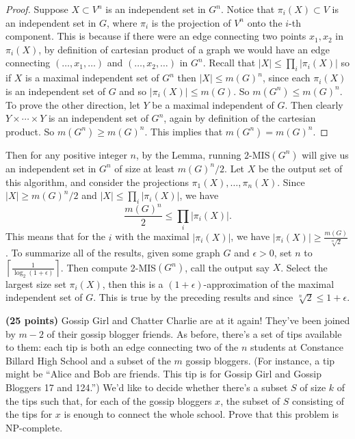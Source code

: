 \documentclass[11pt,letterpaper]{article}
\begin{document}
\begin{solution}
\begin{ilemma}
    \end{ilemma} 
    \begin{proof}
        Suppose $X\subset V^n$ is an independent set in $G^n$. Notice that $\pi_i(X)\subset V$ is an independent set in $G$, where $\pi_i$ is the projection of $V^n$ onto the $i$-th component. This is because if there were an edge connecting two points $x_1, x_2$ in $\pi_i(X)$, by definition of cartesian product of a graph we would have an edge connecting $(\ldots,x_1,\ldots)$ and $(\ldots,x_2,\ldots)$ in $G^n$. Recall that $|X|\leq \prod_i|\pi_i(X)|$ so if $X$ is a maximal independent set of $G^n$ then $|X|\leq m(G)^n$, since each $\pi_i(X)$ is an independent set of $G$ and so $|\pi_i(X)|\leq m(G)$. So $m(G^n)\leq m(G)^n$. To prove the other direction, let $Y$ be a maximal independent of $G$. Then clearly $Y\times\cdots\times Y$ is an independent set of $G^n$, again by definition of the cartesian product. So $m(G^n)\geq m(G)^n$. This implies that $m(G^n)=m(G)^n$. 
    \end{proof}
    Then for any positive integer $n$, by the Lemma, running $2$-MIS$(G^n)$ will give us an independent set in $G^n$ of size at least $m(G)^n /2$. Let $X$ be the output set of this algorithm, and consider the projections $\pi_1(X), \ldots, \pi_n(X)$. Since $|X|\geq m(G)^n /2$ and $|X|\leq \prod_i |\pi_i(X)|$, we have
    \[
        \frac{m(G)^n}{2}\leq \prod_i |\pi_i(X)|
    .\]
    This means that for the $i$ with the maximal $|\pi_i(X)|$, we have $|\pi_i(X)|\geq \frac{m(G)}{\sqrt[n]{2}}$. To summarize all of the results, given some graph $G$ and $\epsilon>0$, set $n$ to $\left\lceil \frac{1}{\log_2(1+\epsilon)} \right\rceil $. Then compute 2-MIS$(G^n)$, call the output say $X$. Select the largest size set $\pi_i(X)$, then this is a $(1+\epsilon)$-approximation of the maximal independent set of $G$. This is true by the preceding results and since $\sqrt[n]{2} \leq 1+\epsilon$. 

\end{solution}

\pagebreak
\begin{problem}\noindent
    {\bf (25 points)} Gossip Girl and Chatter Charlie are at it again! They've been joined by $m-2$ of their gossip blogger friends. As before, there's a set of tips available to them: each tip is both an edge connecting two of the $n$ students at Constance Billard High School and a subset of the $m$ gossip bloggers. (For instance, a tip might be ``Alice and Bob are friends. This tip is for Gossip Girl and Gossip Bloggers 17 and 124.'') We'd like to decide whether there's a subset $S$ of size $k$ of the tips such that, for each of the gossip bloggers $x$, the subset of $S$ consisting of the tips for $x$ is enough to connect the whole school. Prove that this problem is NP-complete.
\end{problem}
\end{document}
